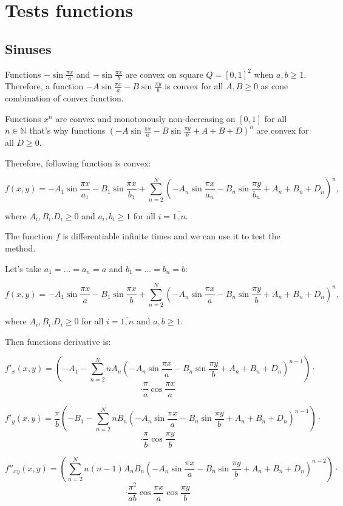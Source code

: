 \documentclass[12pt]{article}
\begin{document}
\section{Tests functions}

\subsection{Sinuses}
Functions $-\sin\frac{\pi x}{a}$ and $-\sin\frac{\pi x}{b}$ are convex on square $Q = [0,1]^2$ when $a,b\geq 1$. Therefore, a function $-A\sin\frac{\pi x}{a} - B\sin\frac{\pi y}{b}$ is convex for all $A,B\geq 0$ as cone combination of convex function.

Functions $x^n$ are convex and monotonously non-decreasing on $[0, 1]$ for all $n \in \mathbb{N}$ that's why functions $\left(-A\sin\frac{\pi x}{a} - B\sin\frac{\pi y}{b} + A + B + D\right)^n$ are convex for all $D\geq 0$.

Therefore, following function is convex:

$$f(x,y) = -A_1\sin\frac{\pi x}{a_1} - B_1\sin\frac{\pi x}{b_1} + \sum\limits_{n=2}^N\left(-A_n\sin\frac{\pi x}{a_n} - B_n\sin\frac{\pi y}{b_n} + A_n + B_n + D_n\right)^n,$$

where $A_i, B_i. D_i\geq 0$ and $a_i, b_i \geq 1$ for all $i = \overline{1, n}$.

The function $f$ is differentiable infinite times and we can use it to test the method.

Let's take $a_1 = \dots = a_n = a$ and $b_1 = \dots = b_n = b$:

$$f(x,y) = -A_1\sin\frac{\pi x}{a} - B_1\sin\frac{\pi x}{b} + \sum\limits_{n=2}^N\left(-A_n\sin\frac{\pi x}{a} - B_n\sin\frac{\pi y}{b} + A_n + B_n + D_n\right)^n,$$

where $A_i, B_i. D_i\geq 0$ for all $i = \overline{1, n}$ and $a, b \geq 1$.

Then functions derivative is:

$$f'_x(x,y) = \left(-A_1 - \sum\limits_{n=2}^NnA_n\left(-A_n\sin\frac{\pi x}{a} - B_n\sin\frac{\pi y}{b} + A_n + B_n + D_n\right)^{n-1}\right)\cdot$$
$$\cdot\frac{\pi}{a}\cos \frac{\pi x}{a}$$

$$f'_y(x,y) = \frac{\pi}{b}\left(-B_1 - \sum\limits_{n=2}^NnB_n\left(-A_n\sin\frac{\pi x}{a} - B_n\sin\frac{\pi y}{b} + A_n + B_n + D_n\right)^{n-1}\right)\cdot$$
$$\cdot\frac{\pi}{b}\cos \frac{\pi y}{b}$$

$$f''_{xy}(x,y) = \left(\sum\limits_{n=2}^Nn(n-1)A_nB_n\left(-A_n\sin\frac{\pi x}{a} - B_n\sin\frac{\pi y}{b} + A_n + B_n + D_n\right)^{n-2}\right)\cdot$$
$$\cdot\frac{\pi^2}{ab}\cos \frac{\pi x}{a}\cos \frac{\pi y}{b}$$
\end{document}

